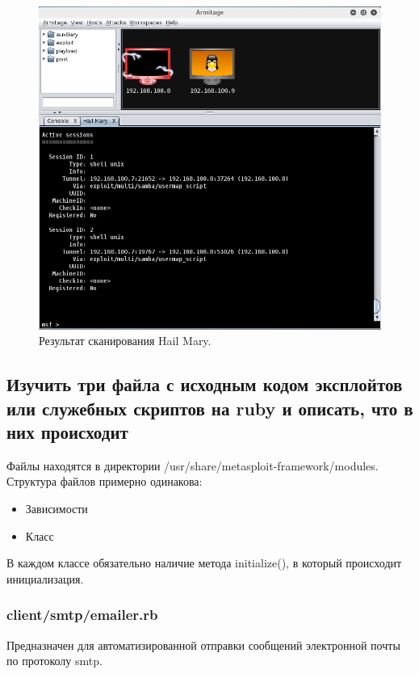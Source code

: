 \documentclass[10pt,a4paper]{article}
\begin{document}
\begin{figure}[H]
\centering
\includegraphics[width=\textwidth]{hail_mary_2}
\caption{Результат сканирования Hail Mary.}
\end{figure}

\subsection{Изучить три файла с исходным кодом эксплойтов или служебных скриптов на ruby и описать, что в них происходит}

Файлы находятся в директории /usr/share/metasploit-framework/modules.
Структура файлов примерно одинакова:
\begin{itemize}
\item{Зависимости}
\item{Класс}
\end{itemize}
В каждом классе обязательно наличие метода initialize(), в который происходит инициализация.


\subsubsection{client/smtp/emailer.rb}

Предназначен для автоматизированной отправки сообщений электронной почты по протоколу smtp.
\end{document}
